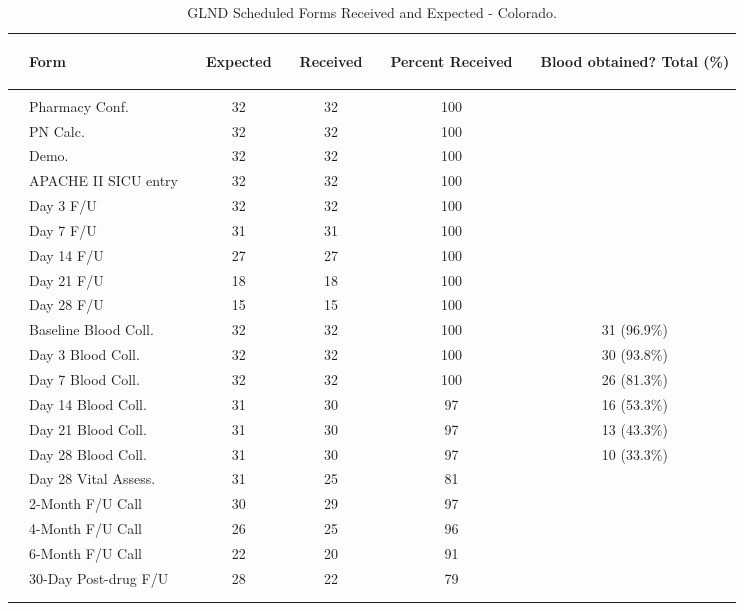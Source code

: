\documentclass[dvips,10pt]{article}
\begin{document}
\clearpage
\begin{table}[t]
\caption
{ GLND Scheduled Forms Received and Expected - Colorado. }
\begin{center}
\begin{tabular}{ @{}l@{}
@{}l@{}@{}p{1.5em}@{}@{}c@{}@{}p{1.5em}@{}@{}c@{}@{}p{1.5em}@{}@{}c@{}@{}p{1.5em}@{}@{}c@{}
}
\hline

& \parbox{6em}{\begin{center}Form\end{center}} && \parbox{6em}{\begin{center}Expected\end{center}} && \parbox{6em}{\begin{center}Received\end{center}} && \parbox{6em}{\begin{center}Percent Received\end{center}} && \parbox{6em}{\begin{center}Blood obtained? Total (\%)\end{center}} \\

\hline

\\
& Pharmacy Conf. && 32 && 32 && 100 &&  \\
& PN Calc. && 32 && 32 && 100 &&  \\
& Demo. && 32 && 32 && 100 &&  \\
& APACHE II SICU entry && 32 && 32 && 100 &&  \\
& Day 3 F/U && 32 && 32 && 100 &&  \\
& Day 7 F/U && 31 && 31 && 100 &&  \\
& Day 14 F/U && 27 && 27 && 100 &&  \\
& Day 21 F/U && 18 && 18 && 100 &&  \\
& Day 28 F/U && 15 && 15 && 100 &&  \\
& Baseline Blood Coll. && 32 && 32 && 100 && 31 (96.9\%) \\
& Day 3 Blood Coll. && 32 && 32 && 100 && 30 (93.8\%) \\
& Day 7 Blood Coll. && 32 && 32 && 100 && 26 (81.3\%) \\
& Day 14 Blood Coll. && 31 && 30 && 97 && 16 (53.3\%) \\
& Day 21 Blood Coll. && 31 && 30 && 97 && 13 (43.3\%) \\
& Day 28 Blood Coll. && 31 && 30 && 97 && 10 (33.3\%) \\
& Day 28 Vital Assess. && 31 && 25 && 81 &&  \\
& 2-Month F/U Call && 30 && 29 && 97 &&  \\
& 4-Month F/U Call && 26 && 25 && 96 &&  \\
& 6-Month F/U Call && 22 && 20 && 91 &&  \\
& 30-Day Post-drug F/U && 28 && 22 && 79 &&  \\
\\
\hline \\

\end{tabular}

\end{center}
 \end{table}
\end{document}
